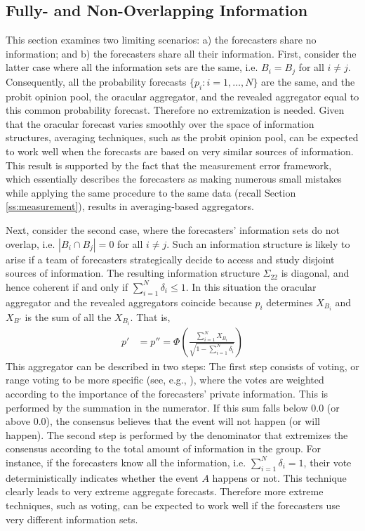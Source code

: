 \documentclass[11pt]{article}
\theoremstyle{definition}
\theoremstyle{definition}
\begin{document}
\subsection{Fully- and Non-Overlapping Information}
\label{disjoint}
This section examines two limiting scenarios: a) the forecasters share
no information; and b) the forecasters share all their
information. First, consider the latter case where all the information
sets are the same, i.e. $B_{i} = B_j$ for all $i \neq j$. Consequently, all
the probability forecasts $\{p_i : i = 1, \dots, N\}$ are the same,
and the probit opinion pool, the oracular aggregator, and the revealed
aggregator equal to this common probability forecast. Therefore no
extremization is needed. Given that the oracular forecast varies
smoothly over the space of information structures, averaging
techniques, such as the probit opinion pool, can be expected to work
well when the forecasts are based on very similar sources of
information. This result is supported by the fact that the
measurement error framework, which essentially describes the
forecasters as making numerous small mistakes while applying the same
procedure to the same data (recall Section \ref{ss:measurement}),
results in averaging-based aggregators.



Next, consider the second case, where the forecasters' information
sets do not overlap, i.e. $|B_{i} \cap B_{j}| = 0$ for all $i \neq j$. Such
an information structure is likely to arise if a team of forecasters
strategically decide to access and study disjoint sources of
information. The resulting information structure $\Sigma_{22}$ is
diagonal, and hence coherent if and only if $\sum_{i=1}^N \delta_i
\leq 1$.  In this situation the oracular aggregator and the revealed
aggregators coincide because $p_i$ determines $X_{B_i}$ and $X_{B'}$ is
the sum of all the $X_{B_i}$. That is,
 \begin{align*}
p' &= p'' =  \Phi\left( \frac{\sum_{i=1}^N X_{B_i}}
  {\sqrt{1- \sum_{i=1}^N \delta_i}} \right) 
\end{align*}
This aggregator can be described in two steps: The first step consists
of voting, or range voting to be more specific (see, e.g.,
\citealt{fishkin1997voice}), where the votes are weighted according to
the importance of the forecasters' private information. This is
performed by the summation in the numerator. If this sum falls below
$0.0$ (or above $0.0$), the consensus believes that the event will not
happen (or will happen). The second step is performed by the
denominator that extremizes the consensus according to the total
amount of information in the group. For instance, if the forecasters
know all the information, i.e. $\sum_{i=1}^N \delta_i = 1$, their vote
deterministically indicates whether the event $A$ happens or not. This
technique clearly leads to very extreme aggregate forecasts. Therefore
more extreme techniques, such as voting, can be expected to work well
if the forecasters use very different information sets.
\end{document}
